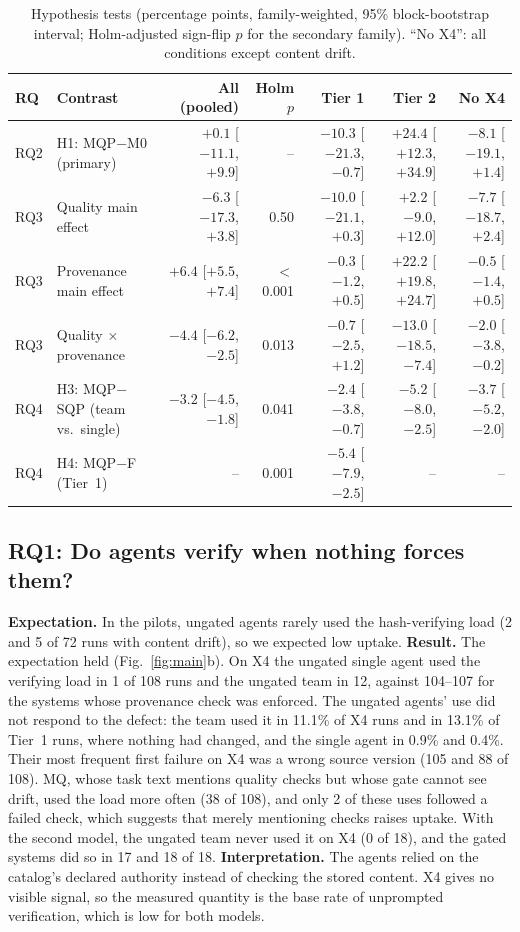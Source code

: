 \documentclass[conference]{IEEEtran}
\newcommand{\sys}[1]{\textsf{#1}}
\begin{document}
\begin{table}[t]
\caption{Hypothesis tests (percentage points, family-weighted, 95\% block-bootstrap interval; Holm-adjusted
sign-flip $p$ for the secondary family). ``No X4'': all conditions except content drift.}
\label{tab:contrasts}
\centering\footnotesize\setlength{\tabcolsep}{3pt}
\begin{tabular}{@{}llrrrrr@{}}
\toprule
RQ & Contrast & All (pooled) & Holm $p$ & Tier 1 & Tier 2 & No X4 \\
\midrule
RQ2 & H1: \sys{MQP}$-$\sys{M0} (primary) & $+0.1$ [$-11.1$, $+9.9$] & -- & $-10.3$ [$-21.3$, $-0.7$] & $+24.4$ [$+12.3$, $+34.9$] & $-8.1$ [$-19.1$, $+1.4$] \\
RQ3 & Quality main effect & $-6.3$ [$-17.3$, $+3.8$] & 0.50 & $-10.0$ [$-21.1$, $+0.3$] & $+2.2$ [$-9.0$, $+12.0$] & $-7.7$ [$-18.7$, $+2.4$] \\
RQ3 & Provenance main effect & $+6.4$ [$+5.5$, $+7.4$] & $<$0.001 & $-0.3$ [$-1.2$, $+0.5$] & $+22.2$ [$+19.8$, $+24.7$] & $-0.5$ [$-1.4$, $+0.5$] \\
RQ3 & Quality $\times$ provenance & $-4.4$ [$-6.2$, $-2.5$] & 0.013 & $-0.7$ [$-2.5$, $+1.2$] & $-13.0$ [$-18.5$, $-7.4$] & $-2.0$ [$-3.8$, $-0.2$] \\
RQ4 & H3: \sys{MQP}$-$\sys{SQP} (team vs.\ single) & $-3.2$ [$-4.5$, $-1.8$] & 0.041 & $-2.4$ [$-3.8$, $-0.7$] & $-5.2$ [$-8.0$, $-2.5$] & $-3.7$ [$-5.2$, $-2.0$] \\
RQ4 & H4: \sys{MQP}$-$\sys{F} (Tier~1) & -- & 0.001 & $-5.4$ [$-7.9$, $-2.5$] & -- & -- \\
\bottomrule
\end{tabular}
\end{table}

\subsection{RQ1: Do agents verify when nothing forces them?}
\textbf{Expectation.} In the pilots, ungated agents rarely used the hash-verifying load (2 and 5 of 72 runs with
content drift), so we expected low uptake.
\textbf{Result.} The expectation held (Fig.~\ref{fig:main}b). On X4 the ungated single agent used the verifying load in
1 of 108 runs and the ungated team in 12, against 104--107 for the systems whose provenance check was enforced. The
ungated agents' use did not respond to the defect: the team used it in 11.1\% of X4 runs and in 13.1\% of Tier~1 runs,
where nothing had changed, and the single agent in 0.9\% and 0.4\%. Their most frequent first failure on X4 was a
wrong source version (105 and 88 of 108). \sys{MQ}, whose task text mentions quality checks but whose gate cannot see
drift, used the load more often (38 of 108), and only 2 of these uses followed a failed check, which suggests that
merely mentioning checks raises uptake. With the second model, the ungated team never used it on X4 (0 of 18), and
the gated systems did so in 17 and 18 of 18.
\textbf{Interpretation.} The agents relied on the catalog's declared authority instead of checking the stored
content. X4 gives no visible signal, so the measured quantity is the base rate of unprompted verification, which is
low for both models.
\end{document}
